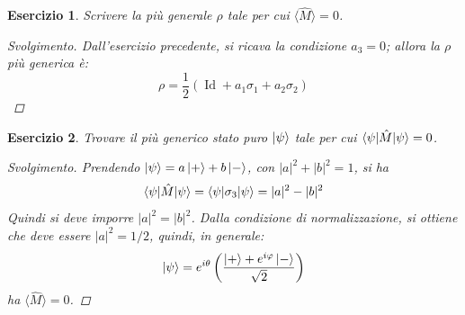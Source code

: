 \documentclass[11pt, a4paper]{scrartcl} %
\numberwithin{equation}{subsection}
\theoremstyle{style2}
\theoremstyle{style1}
\newtheorem{esercizio}{Esercizio}[section]
\renewcommand\qedsymbol{$\blacksquare$}
\newenvironment{svolgimento}{\renewcommand\qedsymbol{$\spadesuit$}\begin{proof}[Svolgimento]}{\end{proof}}
\begin{document}
\begin{esercizio}
	Scrivere la pi\`u generale $\rho $ tale per cui $\langle \hat{M} \rangle=0$.
	\begin{svolgimento}
		Dall'esercizio precedente, si ricava la condizione $a_3= 0$; allora la $\rho $ pi\`u generica \`e:
		\[
		\rho  = \frac{1}{2}\left(\operatorname{Id}  + a_1\sigma _1 + a_2 \sigma _2\right) 
		\] 
	\end{svolgimento}
\end{esercizio}
\begin{esercizio}
	Trovare il pi\`u generico stato puro $\ket{\psi } $ tale per cui $\braket{\psi |\hat{M}|\psi } = 0 $.
	\begin{svolgimento}
		Prendendo $\ket{\psi } = a \ket{+} + b \ket{-} $, con $\lvert a \rvert ^2 + \lvert b \rvert ^2 = 1$, si ha
		\[
		\braket{\psi |\hat{M}|\psi } = \braket{\psi |\sigma _3|\psi } = \lvert a \rvert ^2 - \lvert b \rvert ^2
		\] 
		Quindi si deve imporre $\lvert a \rvert ^2 = \lvert b \rvert ^2$.
		Dalla condizione di normalizzazione, si ottiene che deve essere $\lvert a \rvert ^2 = 1/2$, quindi, in generale:
		\[
		\ket{\psi } = e^{i \theta } \left(\frac{\ket{+} + e^{i \varphi } \ket{-}}{\sqrt{2} }\right) 
		\] 
		ha $\langle \hat{M} \rangle= 0 $.
	\end{svolgimento}
\end{esercizio}
\end{document}
